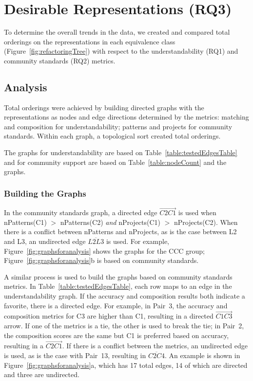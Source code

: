 

\section{Desirable Representations (RQ3)}
\label{sec:rq3}
To determine the overall trends in the data, we created and compared total orderings on the representations in each equivalence class (Figure~\ref{fig:refactoringTree})  with respect to the understandability (RQ1) and community standards (RQ2)   metrics.

\subsection{Analysis}
Total orderings were achieved by building directed graphs with the representations as nodes and edge directions determined by the metrics: matching and composition for understandability;  patterns and projects for community standards. Within each graph, a topological sort created total  orderings.

The graphs for understandability are based on Table~\ref{table:testedEdgesTable} and for community support are based on Table~\ref{table:nodeCount} and the graphs. 



\subsubsection{Building the Graphs}
In the community standards graph, a directed edge  $\overrightarrow{C2  C1}$ is used when  nPatterns(C1) $>$ nPatterns(C2) \emph{and}  nProjects(C1) $>$ nProjects(C2).
When there is a conflict between nPatterns and nProjects, as is the case between L2 and L3, 
an undirected edge $\overline{L2L3}$ is used. %
For example, Figure~\ref{fig:graphsforanalysis} shows the graphs for  the CCC group; Figure~\ref{fig:graphsforanalysis}b is based  on community standards. 

A similar process is used to build the graphs based on community standards metrics. 
In Table~\ref{table:testedEdgesTable}, each row maps to an edge in the understandability graph. 
If the accuracy and composition results both indicate a favorite, there is a directed edge. For example, in Pair~3, the accuracy and composition metrics for C3 are higher than C1, resulting in a directed $\overrightarrow{C1  C3}$ arrow. If one of the metrics is a tie, the other is used to break the tie; in Pair~2, the composition scores are the same but C1 is preferred based on accuracy, resulting in a $\overrightarrow{C2  C1}$. If there is a conflict between the metrics, an undirected edge is used, as is the case with Pair~13, resulting in $\overline{C2 C4}$.
An example is shown in Figure~\ref{fig:graphsforanalysis}a, which has 17 total edges, 14 of which are directed and three are undirected. 

